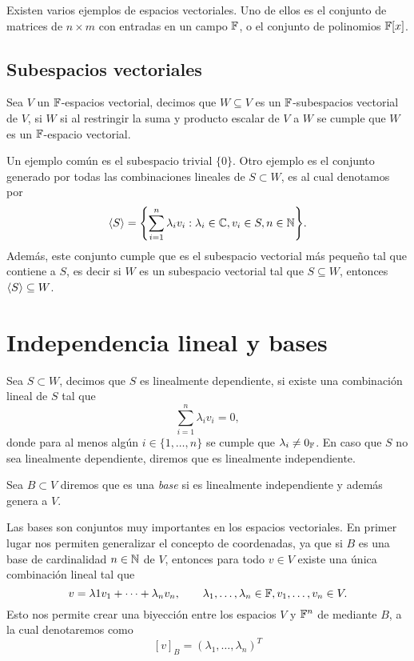Existen varios ejemplos de espacios vectoriales. Uno de ellos es el conjunto de matrices de $n \times m $ con entradas en un campo $\mathbb{F}$, o el conjunto de polinomios $\mathbb{F}[x]$.

\subsection{Subespacios vectoriales}

\begin{defi}
  Sea $V$ un $\mathbb{F}$-espacios vectorial, decimos que $W \subseteq V$ es un $\mathbb{F}$-subespacios vectorial de $V$, si $W$ si al restringir la suma y producto escalar de $V$ a $W$ se cumple que $W$ es un $\mathbb{F}$-espacio vectorial.
\end{defi}

Un ejemplo común es el subespacio trivial $\{0\}$. Otro ejemplo es el conjunto generado por todas las combinaciones lineales de $S \subset W$,  es al cual denotamos por
\[ \inner{S} = \set{ \sum_{i=1}^n \lambda_i v_i : \lambda_i \in \C, v_i \in S, n \in \N }. \]
Además, este conjunto cumple que es el subespacio vectorial más pequeño tal que contiene a $S$, es decir si $W$ es un subespacio vectorial tal que $S \subseteq W$, entonces $\langle S\rangle \subseteq W$.

\section{Independencia lineal y bases}

\begin{defi}
  Sea $S \subset W$, decimos que $S$ es linealmente dependiente, si existe una combinación lineal de $S$ tal que
  \[ \sum_{i=1}^n \lambda_i v_i = 0, \]
  donde para al menos algún $i \in \{1,\ldots,n\}$ se cumple que $\lambda_i \neq 0_{\mathbb{F}}$. En caso que $S$ no sea linealmente dependiente, diremos que es linealmente independiente.

  Sea $B \subset V$ diremos que es una \emph{base} si es linealmente independiente y además genera a $V$.
\end{defi}

Las bases son conjuntos muy importantes en los espacios vectoriales. En primer lugar nos permiten generalizar el concepto de coordenadas, ya que si $B$ es una base de cardinalidad $n \in \mathbb{N}$ de $V$, entonces para todo $v \in V$ existe una única combinación lineal tal que 
\[ v = \lambda 1 v_1 + \cdots + \lambda_n v_n, \qquad \lambda_1,\ldots,\lambda_n \in \mathbb{F}, v_1,\ldots,v_n \in V. \]
Esto nos permite crear una biyección entre los espacios $V$ y $\mathbb{F}^n$ de mediante $B$, a la cual denotaremos como
\[ [v]_B = (\lambda_1, \ldots, \lambda_n)^T \]

